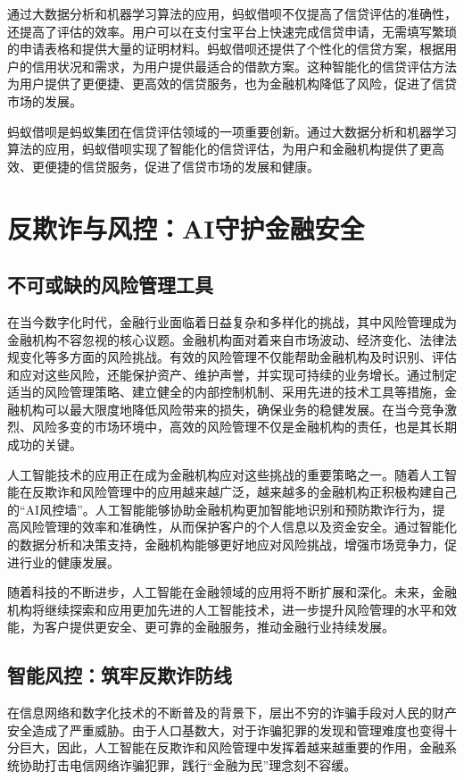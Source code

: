 通过大数据分析和机器学习算法的应用，蚂蚁借呗不仅提高了信贷评估的准确性，还提高了评估的效率。用户可以在支付宝平台上快速完成信贷申请，无需填写繁琐的申请表格和提供大量的证明材料。蚂蚁借呗还提供了个性化的信贷方案，根据用户的信用状况和需求，为用户提供最适合的借款方案。这种智能化的信贷评估方法为用户提供了更便捷、更高效的信贷服务，也为金融机构降低了风险，促进了信贷市场的发展。

蚂蚁借呗是蚂蚁集团在信贷评估领域的一项重要创新。通过大数据分析和机器学习算法的应用，蚂蚁借呗实现了智能化的信贷评估，为用户和金融机构提供了更高效、更便捷的信贷服务，促进了信贷市场的发展和健康。

\section{反欺诈与风控：AI守护金融安全}
\subsection{不可或缺的风险管理工具}
在当今数字化时代，金融行业面临着日益复杂和多样化的挑战，其中风险管理成为金融机构不容忽视的核心议题。金融机构面对着来自市场波动、经济变化、法律法规变化等多方面的风险挑战。有效的风险管理不仅能帮助金融机构及时识别、评估和应对这些风险，还能保护资产、维护声誉，并实现可持续的业务增长。通过制定适当的风险管理策略、建立健全的内部控制机制、采用先进的技术工具等措施，金融机构可以最大限度地降低风险带来的损失，确保业务的稳健发展。在当今竞争激烈、风险多变的市场环境中，高效的风险管理不仅是金融机构的责任，也是其长期成功的关键。

人工智能技术的应用正在成为金融机构应对这些挑战的重要策略之一。随着人工智能在反欺诈和风险管理中的应用越来越广泛，越来越多的金融机构正积极构建自己的“AI风控墙”。人工智能能够协助金融机构更加智能地识别和预防欺诈行为，提高风险管理的效率和准确性，从而保护客户的个人信息以及资金安全。通过智能化的数据分析和决策支持，金融机构能够更好地应对风险挑战，增强市场竞争力，促进行业的健康发展。

随着科技的不断进步，人工智能在金融领域的应用将不断扩展和深化。未来，金融机构将继续探索和应用更加先进的人工智能技术，进一步提升风险管理的水平和效能，为客户提供更安全、更可靠的金融服务，推动金融行业持续发展。

\subsection{智能风控：筑牢反欺诈防线}

在信息网络和数字化技术的不断普及的背景下，层出不穷的诈骗手段对人民的财产安全造成了严重威胁。由于人口基数大，对于诈骗犯罪的发现和管理难度也变得十分巨大，因此，人工智能在反欺诈和风险管理中发挥着越来越重要的作用，金融系统协助打击电信网络诈骗犯罪，践行“金融为民”理念刻不容缓。

